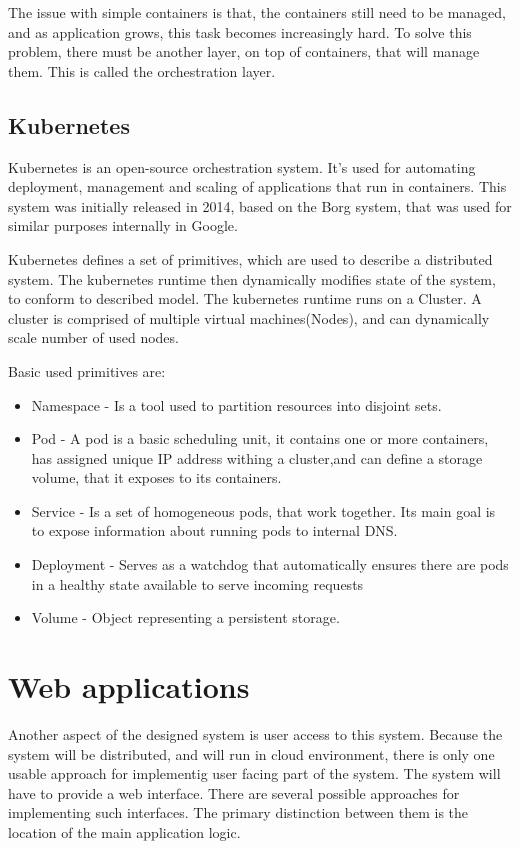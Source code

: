 The issue with simple containers is that, the containers still need to be managed, and as application
grows, this task becomes increasingly hard. To solve this problem, there must be another layer, on top of containers,
that will manage them. This is called the orchestration layer.

\subsection{Kubernetes}

Kubernetes\cite{web:k8s} is an open-source orchestration system. It's used for automating
deployment, management and scaling of applications that run in containers. This system was initially released in 2014,
based on the Borg\cite{borg} system, that was used for similar purposes internally in Google.

Kubernetes defines a set of primitives, which are used to describe a distributed system. The kubernetes
runtime then dynamically modifies state of the system, to conform to described model. The kubernetes runtime
runs on a Cluster. A cluster is comprised of multiple virtual machines(Nodes), and can dynamically scale number
of used nodes.

Basic used primitives are:
\begin{itemize}
    \item Namespace - Is a tool used to partition resources into disjoint sets.
    \item Pod - A pod is a basic scheduling unit, it contains one or more containers, has assigned unique IP address
    withing a cluster,and can define a storage volume, that it exposes to its containers.
    \item Service - Is a set of homogeneous pods, that work together. Its main goal is to expose information about running
    pods to internal DNS.
    \item Deployment - Serves as a watchdog that automatically ensures there are pods in a healthy state available to
    serve incoming requests
    \item Volume - Object representing a persistent storage.
\end{itemize}


\section{Web applications}
Another aspect of the designed system is user access to this system. Because the system will be distributed, and will run
in cloud environment, there is only one usable approach for implementig user facing part of the system. The system will have
to provide a web interface. There are several possible approaches for implementing such interfaces. The primary
distinction between them is the location of the main application logic.

